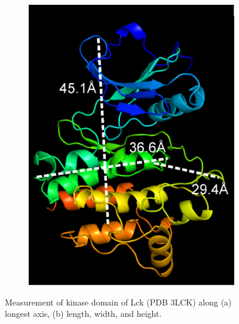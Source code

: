 \documentclass[../AdvancementSummary.tex]{subfiles}
\begin{document}
\begin{figure}[H]
\begin{center}
\begin{subfigure}{0.4\linewidth}
\includegraphics[width=\linewidth]{LckPyMol/LWD.eps}
\caption{}
\end{subfigure}
\end{center}
\caption{Measurement of kinase domain of Lck (PDB 3LCK) along (a) longest axis, (b) length, width, and height. \label{fig: LckPyMol}}
\end{figure}



%
%
%
\end{document}
